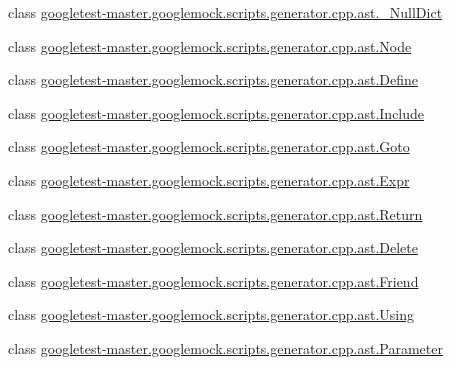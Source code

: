 \begin{DoxyCompactItemize}
\item 
class \mbox{\hyperlink{classgoogletest-master_1_1googlemock_1_1scripts_1_1generator_1_1cpp_1_1ast_1_1___null_dict}{googletest-\/master.\+googlemock.\+scripts.\+generator.\+cpp.\+ast.\+\_\+\+Null\+Dict}}
\item 
class \mbox{\hyperlink{classgoogletest-master_1_1googlemock_1_1scripts_1_1generator_1_1cpp_1_1ast_1_1_node}{googletest-\/master.\+googlemock.\+scripts.\+generator.\+cpp.\+ast.\+Node}}
\item 
class \mbox{\hyperlink{classgoogletest-master_1_1googlemock_1_1scripts_1_1generator_1_1cpp_1_1ast_1_1_define}{googletest-\/master.\+googlemock.\+scripts.\+generator.\+cpp.\+ast.\+Define}}
\item 
class \mbox{\hyperlink{classgoogletest-master_1_1googlemock_1_1scripts_1_1generator_1_1cpp_1_1ast_1_1_include}{googletest-\/master.\+googlemock.\+scripts.\+generator.\+cpp.\+ast.\+Include}}
\item 
class \mbox{\hyperlink{classgoogletest-master_1_1googlemock_1_1scripts_1_1generator_1_1cpp_1_1ast_1_1_goto}{googletest-\/master.\+googlemock.\+scripts.\+generator.\+cpp.\+ast.\+Goto}}
\item 
class \mbox{\hyperlink{classgoogletest-master_1_1googlemock_1_1scripts_1_1generator_1_1cpp_1_1ast_1_1_expr}{googletest-\/master.\+googlemock.\+scripts.\+generator.\+cpp.\+ast.\+Expr}}
\item 
class \mbox{\hyperlink{classgoogletest-master_1_1googlemock_1_1scripts_1_1generator_1_1cpp_1_1ast_1_1_return}{googletest-\/master.\+googlemock.\+scripts.\+generator.\+cpp.\+ast.\+Return}}
\item 
class \mbox{\hyperlink{classgoogletest-master_1_1googlemock_1_1scripts_1_1generator_1_1cpp_1_1ast_1_1_delete}{googletest-\/master.\+googlemock.\+scripts.\+generator.\+cpp.\+ast.\+Delete}}
\item 
class \mbox{\hyperlink{classgoogletest-master_1_1googlemock_1_1scripts_1_1generator_1_1cpp_1_1ast_1_1_friend}{googletest-\/master.\+googlemock.\+scripts.\+generator.\+cpp.\+ast.\+Friend}}
\item 
class \mbox{\hyperlink{classgoogletest-master_1_1googlemock_1_1scripts_1_1generator_1_1cpp_1_1ast_1_1_using}{googletest-\/master.\+googlemock.\+scripts.\+generator.\+cpp.\+ast.\+Using}}
\item 
class \mbox{\hyperlink{classgoogletest-master_1_1googlemock_1_1scripts_1_1generator_1_1cpp_1_1ast_1_1_parameter}{googletest-\/master.\+googlemock.\+scripts.\+generator.\+cpp.\+ast.\+Parameter}}

\end{DoxyCompactItemize}
